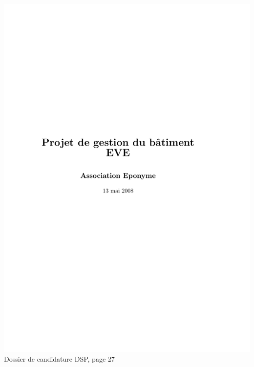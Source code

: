 \includegraphics[scale=0.85,trim=20mm 20mm 20mm 20mm,clip,page=27]{annexes/candidature_dsp.pdf} \\
Dossier de candidature DSP, page 27
\newpage
